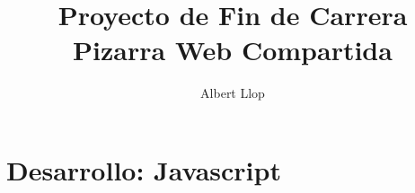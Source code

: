 \documentclass [11pt]{report}
\begin{document}
\author{Albert Llop}
\title{\Huge{\textbf{Proyecto de Fin de Carrera} \\ Pizarra Web Compartida}}
\maketitle
\newpage
\tableofcontents
\chapter{Desarrollo: Javascript}

\newpage

\newpage

\newpage

\newpage

\end{document}
